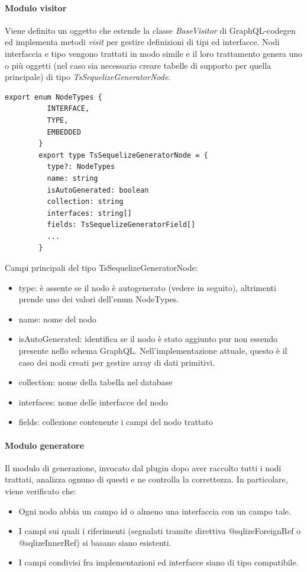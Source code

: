 \documentclass[a4paper, 12pt]{report}
\begin{document}
      \paragraph*{Modulo visitor}
      Viene definito un oggetto che estende la classe \emph{BaseVisitor} di GraphQL-codegen ed implementa metodi \emph{visit} per gestire definizioni di tipi ed interfacce.
      Nodi interfaccia e tipo vengono trattati in modo simile e il loro trattamento genera uno o più oggetti (nel caso sia necessario creare tabelle di supporto per quella principale) di tipo \emph{TsSequelizeGeneratorNode}.
      \begin{Verbatim}[samepage=true]
        export enum NodeTypes {
          INTERFACE,
          TYPE,
          EMBEDDED
        }
        export type TsSequelizeGeneratorNode = {
          type?: NodeTypes
          name: string
          isAutoGenerated: boolean
          collection: string
          interfaces: string[]
          fields: TsSequelizeGeneratorField[]
          ...
        }       
      \end{Verbatim}
      Campi principali del tipo TsSequelizeGeneratorNode:
      \begin{itemize}
        \item type: è assente se il nodo è autogenerato (vedere in seguito), altrimenti prende uno dei valori dell'enum NodeTypes.
        \item name: nome del nodo
        \item isAutoGenerated: identifica se il nodo è stato aggiunto pur non essendo presente nello schema GraphQL. Nell'implementazione attuale, questo è il caso dei nodi creati per gestire array di dati primitivi.
        \item collection: nome della tabella nel database
        \item interfaces: nome delle interfacce del nodo
        \item fields: collezione contenente i campi del nodo trattato
      \end{itemize}
      \paragraph*{Modulo generatore}
      Il modulo di generazione, invocato dal plugin dopo aver raccolto tutti i nodi trattati, analizza ognuno di questi e ne controlla la correttezza.
      In particolare, viene verificato che:
      \begin{itemize}
        \item Ogni nodo abbia un campo id o almeno una interfaccia con un campo tale.
        \item I campi sui quali i riferimenti (segnalati tramite direttiva @sqlizeForeignRef o @sqlizeInnerRef) si basano siano esistenti.
        \item I campi condivisi fra implementazioni ed interfacce siano di tipo compatibile.
      \end{itemize}
\end{document}
